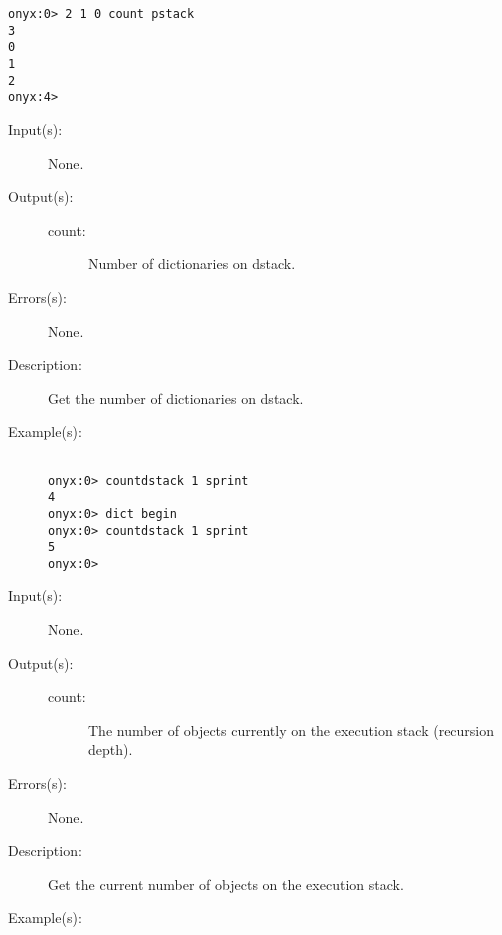 \begin{description}
\begin{description}
\begin{verbatim}
onyx:0> 2 1 0 count pstack
3
0
1
2
onyx:4>
		\end{verbatim}
	\end{description}
\label{systemdict:countdstack}
\item[{\onyxop{--}{countdstack}{count}}: ]
	\begin{description}\item[]
	\item[Input(s): ] None.
	\item[Output(s): ]
		\begin{description}\item[]
		\item[count: ]
			Number of dictionaries on dstack.
		\end{description}
	\item[Errors(s): ] None.
	\item[Description: ]
		Get the number of dictionaries on dstack.
	\item[Example(s): ]\begin{verbatim}

onyx:0> countdstack 1 sprint
4
onyx:0> dict begin
onyx:0> countdstack 1 sprint
5
onyx:0>
		\end{verbatim}
	\end{description}
\label{systemdict:countestack}
\item[{\onyxop{--}{countestack}{count}}: ]
	\begin{description}\item[]
	\item[Input(s): ] None.
	\item[Output(s): ]
		\begin{description}\item[]
		\item[count: ]
			The number of objects currently on the execution stack
			(recursion depth).
		\end{description}
	\item[Errors(s): ] None.
	\item[Description: ]
		Get the current number of objects on the execution stack.
	\item[Example(s): ]\begin{verbatim}


\end{verbatim}
\end{description}
\end{description}

